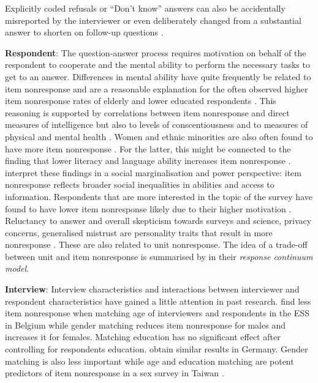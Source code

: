 \documentclass[a4paper,12pt]{article}
\begin{document}
Explicitly coded refusals or ``Don't know'' answers can also be accidentally misreported by the interviewer or even deliberately changed from a substantial answer to shorten on follow-up questions \citep[165]{deleeuwPreventionTreatmentItem2003}.

\textbf{Respondent}:
The question-answer process requires motivation on behalf of the respondent to cooperate and the mental ability to perform the necessary tasks to get to an answer. Differences in mental ability have quite frequently be related to item nonresponse and are a reasonable explanation for the often observed higher item nonresponse rates of elderly and lower educated respondents \citep{pickeryImpactRespondentInterviewer1998, deleeuwPreventionTreatmentItem2003, messerDeterminantsItemNonresponse2012, silberEffectsQuestionRespondent2021}. This reasoning is supported by correlations between item nonresponse and direct measures of intelligence but also to levels of conscentiousness \citep{hedengrenDogThatDidn2012} and to measures of physical and mental health \citep{colsherDataQualityAge1989}. Women and ethnic minorities are also often found to have more item nonresponse \citep{pickeryImpactRespondentInterviewer1998, kupekDeterminantsItemNonresponse1998}. For the latter, this might be connected to the finding that lower literacy and language ability increases item nonresponse \citep{kupekDeterminantsItemNonresponse1998}. \citet{meitingerPowerCultureItem2020} interpret these findings in a social marginalisation and power perspective: item nonresponse reflects broader social inequalities in abilities and access to information.
Respondents that are more interested in the topic of the survey have found to have lower item nonresponse likely due to their higher motivation \citep{kochItemNonresponseEuropean2009, silberEffectsQuestionRespondent2021}. Reluctancy to answer and overall skepticism towards surveys and science, privacy concerns, generalised mistrust are personality traits that result in more nonresponse \citep{silberEffectsQuestionRespondent2021}. These are also related to unit nonresponse. The idea of a trade-off between unit and item nonresponse is summarised by \citet{yanRelationUnitNonresponse2010} in their \textit{response continuum model}.

\textbf{Interview}:
Interview characteristics and interactions between interviewer and respondent characteristics have gained a little attention in past research. \citet{vercruyssenEffectSociodemographicMis2017} find less item nonresponse when matching age of interviewers and respondents in the ESS in Belgium while gender matching reduces item nonresponse for males and increases it for females. Matching education has no significant effect after controlling for respondents education. \citet{silberEffectsQuestionRespondent2021} obtain similar results in Germany. Gender matching is also less important while age and education matching are potent predictors of item nonresponse in a sex survey in Taiwan \citep{tuSocialDistanceRespondent2007}.
 
\end{document}
